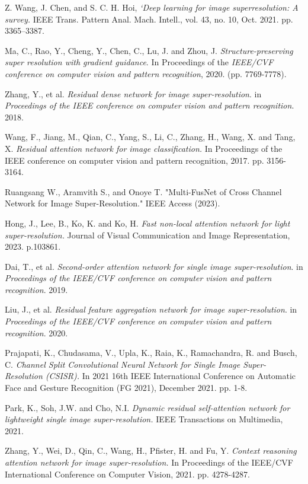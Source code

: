 \documentclass[twocolumn]{svjour3}          %
\begin{document}
\begin{thebibliography}{00}
 Z. Wang, J. Chen, and S. C. H. Hoi, \textit{‘Deep learning for image superresolution: A survey.}  IEEE Trans. Pattern Anal. Mach. Intell., vol. 43, no. 10, Oct. 2021. pp. 3365–3387.

 Ma, C., Rao, Y., Cheng, Y., Chen, C., Lu, J. and Zhou, J. \textit{Structure-preserving super resolution with gradient guidance}. In Proceedings of the \textit{IEEE/CVF conference on computer vision and pattern recognition}, 2020. (pp. 7769-7778).

 Zhang, Y., et al. \textit{Residual dense network for image super-resolution}. in \textit{Proceedings of the IEEE conference on computer vision and pattern recognition}. 2018.

 Wang, F., Jiang, M., Qian, C., Yang, S., Li, C., Zhang, H., Wang, X. and Tang, X. \textit{Residual attention network for image classification.} In Proceedings of the IEEE conference on computer vision and pattern recognition, 2017. pp. 3156-3164.

 Ruangsang W., Aramvith S., and Onoye T. "Multi-FusNet of Cross Channel Network for Image Super-Resolution." IEEE Access (2023).

 Hong, J., Lee, B., Ko, K. and Ko, H. \textit{Fast non-local attention network for light super-resolution.} Journal of Visual Communication and Image Representation, 2023. p.103861.

 Dai, T., et al. \textit{Second-order attention network for single image super-resolution}. in \textit{Proceedings of the IEEE/CVF conference on computer vision and pattern recognition}. 2019.

 Liu, J., et al. \textit{Residual feature aggregation network for image super-resolution}. in \textit{Proceedings of the IEEE/CVF conference on computer vision and pattern recognition}. 2020.

 Prajapati, K., Chudasama, V., Upla, K., Raia, K., Ramachandra, R. and Busch, C. \textit{Channel Split Convolutional Neural Network for Single Image Super-Resolution (CSISR).} In 2021 16th IEEE International Conference on Automatic Face and Gesture Recognition (FG 2021), December 2021. pp. 1-8. 

 Park, K., Soh, J.W. and Cho, N.I. \textit{Dynamic residual self-attention network for lightweight single image super-resolution.} IEEE Transactions on Multimedia, 2021.

 Zhang, Y., Wei, D., Qin, C., Wang, H., Pfister, H. and Fu, Y. \textit{Context reasoning attention network for image super-resolution.} In Proceedings of the IEEE/CVF International Conference on Computer Vision, 2021. pp. 4278-4287.


\end{thebibliography}
\end{document}
